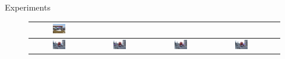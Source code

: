 \documentclass[serif,mathserif,final]{beamer}
\newcommand{\1}{\mathbb{I}} %
\begin{document}
\begin{frame}{}
\begin{columns}[t]
\begin{column}{0.23\linewidth}
\begin{block}{Experiments}
\begin{figure}
\begin{tabular}{|c|c|c|c|c|}
          \includegraphics[width=0.24\textwidth]{car_cnn/2e.png}  \\  
          \hline
          \includegraphics[width=0.24\textwidth]{car_cnn/4a.png} &   
          \includegraphics[width=0.24\textwidth]{car_cnn/4b.png} &   
          \includegraphics[width=0.24\textwidth]{car_cnn/4c.png} &   
          \includegraphics[width=0.24\textwidth]{car_cnn/4d.png}  \\  

\end{tabular}
\end{figure}
\end{block}
\end{column}
\end{columns}
\end{frame}
\end{document}
